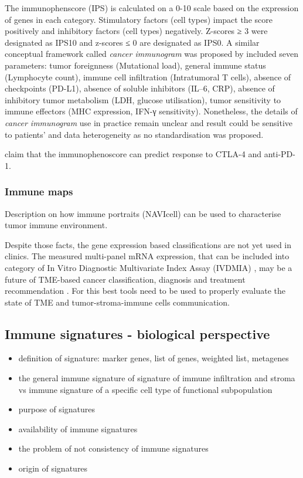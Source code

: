 \documentclass[12pt,]{book}
\providecommand{\tightlist}{%
  \setlength{\itemsep}{0pt}\setlength{\parskip}{0pt}}
\theoremstyle{definition}
\theoremstyle{definition}
\theoremstyle{definition}
\theoremstyle{remark}
\begin{document}
The immunophenscore (IPS) is calculated on a 0-10 scale based on the
expression of genes in each category. Stimulatory factors (cell types)
impact the score positively and inhibitory factors (cell types)
negatively. Z-scores ≥ 3 were designated as IPS10 and z-scores ≤ 0 are
designated as IPS0. A similar conceptual framework called \emph{cancer
immunogram} was proposed by \citet{Blank2016} included seven parameters:
tumor foreignness (Mutational load), general immune status (Lymphocyte
count), immune cell infiltration (Intratumoral T cells), absence of
checkpoints (PD-L1), absence of soluble inhibitors (IL--6, CRP), absence
of inhibitory tumor metabolism (LDH, glucose utilisation), tumor
sensitivity to immune effectors (MHC expression, IFN-γ sensitivity).
Nonetheless, the details of \emph{cancer immunogram} use in practice
remain unclear and result could be sensitive to patients' and data
heterogeneity as no standardisation was proposed.

\citet{Charoentong} claim that the immunophenoscore can predict response
to CTLA-4 and anti-PD-1.

\hypertarget{immune-maps}{%
\subsubsection{Immune maps}\label{immune-maps}}

Description on how immune portraits (NAVIcell) can be used to
characterise tumor immune environment.

Despite those facts, the gene expression based classifications are not
yet used in clinics. The measured multi-panel mRNA expression, that can
be included into category of In Vitro Diagnostic Multivariate Index
Assay (IVDMIA) \citep{Gyorffy2015, Ross2008}, may be a future of
TME-based cancer classification, diagnosis and treatment recommendation
\citep{Gnjatic2017}. For this best tools need to be used to properly
evaluate the state of TME and tumor-stroma-immune cells communication.

\hypertarget{immune-signatures}{%
\subsection{Immune signatures - biological
perspective}\label{immune-signatures}}

\begin{itemize}
\tightlist
\item
  definition of signature: marker genes, list of genes, weighted list,
  metagenes
\item
  the general immune signature of signature of immune infiltration and
  stroma vs immune signature of a specific cell type of functional
  subpopulation
\item
  purpose of signatures
\item
  availability of immune signatures
\item
  the problem of not consistency of immune signatures
\item
  origin of signatures
\end{itemize}
\end{document}
